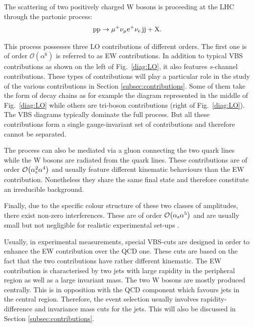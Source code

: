 The scattering of two positively charged W bosons is proceeding at the LHC through the partonic process:
%
\begin{equation}
\text{p}\text{p}\to\mu^+\nu_\mu{\rm e}^+\nu_{\rm e}\,\text{j}\text{j}+\mathrm{X}.
\end{equation}

This process possesses three LO contributions of different orders.
The first one is of order $\mathcal{O}{\left(\alpha^{6}\right)}$ is referred to as EW contributions.
In addition to typical VBS contributions as shown on the left of Fig.~\ref{diag:LO}, it also features $s$-channel contributions.
These types of contributions will play a particular role in the study of the various contributions in Section \ref{subsec:contributions}.
Some of them take the form of decay chains as for example the diagram represented in the middle of Fig.~\ref{diag:LO} while others are tri-boson contributions (right of Fig.~\ref{diag:LO}).
The VBS diagrams typically dominate the full process.
But all these contributions form a single gauge-invariant set of contributions and therefore cannot be separated.

The process can also be mediated via a gluon connecting the two quark lines while the W bosons are radiated from the quark lines.
These contributions are of order $\mathcal{O}{\left(\alpha_\text{s}^{2}\alpha^{4}\right)}$ and usually feature different kinematic behaviours than the EW contribution.
Nonetheless they share the same final state and therefore constitute an irreducible background.

Finally, due to the specific colour structure of these two classes of amplitudes, there exist non-zero interferences.
These are of order $\mathcal{O}{\left(\alpha_{\rm s}\alpha^{5}\right)}$ and are usually small but not negligible for realistic experimental set-ups \cite{Biedermann:2017bss}.

Usually, in experimental measurements, special VBS-cuts are designed in order to enhance the EW contribution over the QCD one.
These cuts are based on the fact that the two contributions have rather different kinematic.
The EW contribution is characterised by two jets with large rapidity in the peripheral region as well as a large invariant mass.
The two W bosons are mostly produced centrally.
This is in opposition with the QCD component which favours jets in the central region.
Therefore, the event selection usually involves rapidity-difference and invariance mass cuts for the jets.
This will also be discussed in Section \ref{subsec:contributions}.

